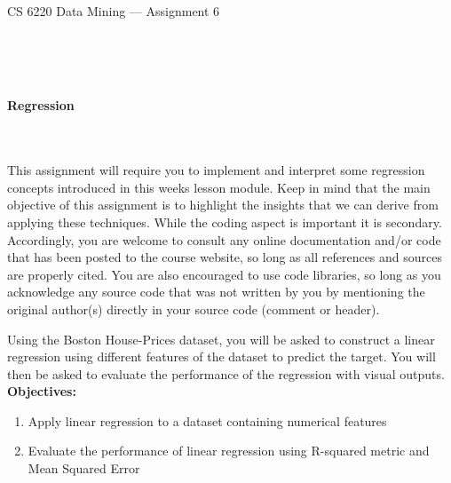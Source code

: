 \documentclass[letter-paper,12pt]{article} %
\begin{document}

\begin{center}
\begin{Huge}
CS 6220 Data Mining --- Assignment 6
\end{Huge}
\end{center}

\hline
\hline
~\\~\\~\\

\begin{center}
\begin{Large}
\textbf{Regression}
\end{Large}
\end{center}
~\\~\\

This assignment will require you to implement and interpret some regression concepts introduced in this weeks lesson module. Keep in mind that the main objective of this assignment is to highlight the insights that we can derive from applying these techniques. While the coding aspect is important it is secondary. Accordingly, you are welcome to consult any online documentation and/or code that has been posted to the course website, so long as all references and sources are properly cited. You are also encouraged to use code libraries, so long as you acknowledge any source code that was not written by you by mentioning the original author(s) directly in your source code (comment or header).

Using the Boston House-Prices dataset, you will be asked to construct a linear regression using different features of the dataset to predict the target. You will then be asked to evaluate the performance of the regression with visual outputs.\\

\textbf{Objectives:}
\begin{enumerate}
    \item Apply linear regression to a dataset containing numerical features 
    \item Evaluate the performance of linear regression using R-squared metric and Mean Squared Error
\end{enumerate}
~\\
\end{document}

